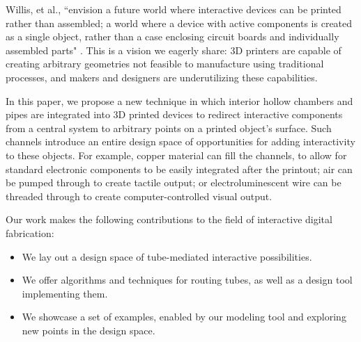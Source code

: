 Willis, et al., ``envision a future world where interactive devices can be printed rather than assembled; a world where a device with active components is created as a single object, rather than a case enclosing circuit boards and individually assembled parts" \cite{Willis-printedoptics}.  This is a vision we eagerly share: 3D printers are capable of creating arbitrary geometries not feasible to manufacture using traditional processes, and makers and designers are underutilizing these capabilities.


In this paper, we propose a new technique in which interior hollow chambers and pipes are integrated into 3D printed devices to redirect interactive components from a central system to arbitrary points on a printed object's surface. Such channels introduce an entire design space of opportunities for adding interactivity to these objects. For example, copper material can fill the channels, to allow for standard electronic components to be easily integrated after the printout; air can be pumped through to create tactile output; or electroluminescent wire can be threaded through to create computer-controlled visual output.

Our work makes the following contributions to the field of interactive digital fabrication:

\begin{itemize}
\item We lay out a design space of tube-mediated interactive possibilities. 
\item We offer algorithms and techniques for routing tubes, as well as a design tool implementing them.
\item We showcase a set of examples, enabled by our modeling tool and exploring new points in the design space.
\end{itemize}

